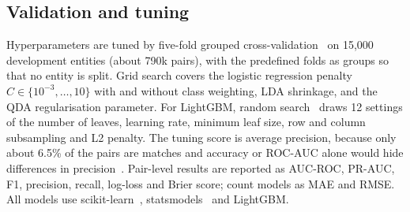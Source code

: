\subsection{Validation and tuning}
Hyperparameters are tuned by five-fold grouped cross-validation~\cite{kohavi1995} on 15,000 development entities
(about 790k pairs), with the predefined folds as groups so that no entity is split. Grid search covers the
logistic regression penalty $C\in\{10^{-3},\dots,10\}$ with and without class weighting, LDA shrinkage, and the QDA
regularisation parameter. For LightGBM, random search~\cite{bergstra2012} draws 12 settings of the number of leaves,
learning rate, minimum leaf size, row and column subsampling and L2 penalty. The tuning score is average precision,
because only about 6.5\% of the pairs are matches and accuracy or ROC-AUC alone would hide differences in
precision~\cite{saito2015}. Pair-level results are reported as AUC-ROC, PR-AUC, F1, precision, recall, log-loss and
Brier score; count models as MAE and RMSE. All models use scikit-learn~\cite{pedregosa2011},
statsmodels~\cite{seabold2010} and LightGBM.
